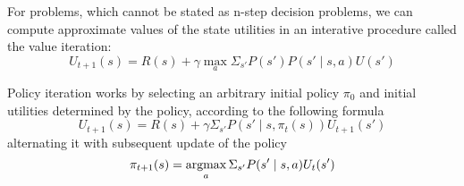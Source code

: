 {
    For problems, which cannot be stated as n-step decision problems, we can compute approximate values of the state utilities in an interative procedure called the value iteration:
    \begin{equation}
        U_{t+1}(s) = R(s) + \gamma \max_a \Sigma_{s'} P(s')P(s'\mid s,a) U(s')
        
    \end{equation}
}


{
    Policy iteration works by selecting an arbitrary initial policy $\pi_0$ and initial utilities determined by the policy, according to the following formula
     \begin{equation}
         U_{t+1}(s) = R(s) + \gamma \Sigma_{s'} P(s' \mid s, \pi_t(s))U_{t+1}(s')
    \end{equation}
    alternating it with subsequent update of the policy
    \begin{equation}
        \pi_{t+1}(s) = \operatorname*{arg max}_a\Sigma_{s'}P(s' \mid s,a) U_t(s')
    \end{equation}
}
